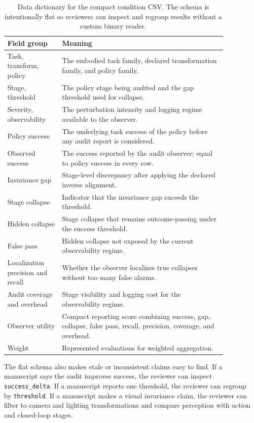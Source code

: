\documentclass{article}
\begin{document}
\begin{table}[t]
\centering
\small
\begin{tabular}{p{0.22\linewidth}p{0.66\linewidth}}
\toprule
Field group & Meaning \\
\midrule
Task, transform, policy & The embodied task family, declared transformation family, and policy family. \\
Stage, threshold & The policy stage being audited and the gap threshold used for collapse. \\
Severity, observability & The perturbation intensity and logging regime available to the observer. \\
Policy success & The underlying task success of the policy before any audit report is considered. \\
Observed success & The success reported by the audit observer; equal to policy success in every row. \\
Invariance gap & Stage-level discrepancy after applying the declared inverse alignment. \\
Stage collapse & Indicator that the invariance gap exceeds the threshold. \\
Hidden collapse & Stage collapse that remains outcome-passing under the success threshold. \\
False pass & Hidden collapse not exposed by the current observability regime. \\
Localization precision and recall & Whether the observer localizes true collapses without too many false alarms. \\
Audit coverage and overhead & Stage visibility and logging cost for the observability regime. \\
Observer utility & Compact reporting score combining success, gap, collapse, false pass, recall, precision, coverage, and overhead. \\
Weight & Represented evaluations for weighted aggregation. \\
\bottomrule
\end{tabular}
\caption{Data dictionary for the compact condition CSV. The schema is intentionally flat so reviewers can inspect and regroup results without a custom binary reader.}
\label{tab:data-dictionary}
\end{table}

The flat schema also makes stale or inconsistent claims easy to find. If a manuscript says the audit improves success, the reviewer can inspect \texttt{success\_delta}. If a manuscript reports one threshold, the reviewer can regroup by \texttt{threshold}. If a manuscript makes a visual invariance claim, the reviewer can filter to camera and lighting transformations and compare perception with action and closed-loop stages.
\end{document}
